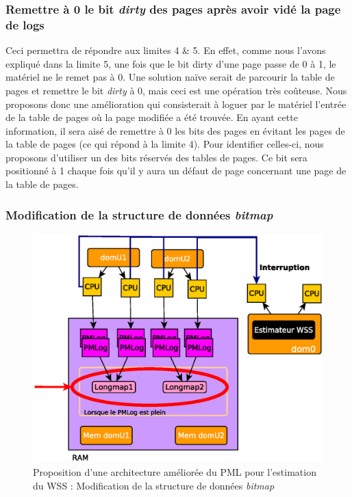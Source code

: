 \subsubsection{Remettre à 0 le bit \textit{dirty} des pages après avoir vidé la page de logs}
Ceci permettra de répondre aux limites 4 \& 5. En effet, comme nous l'avons expliqué dans la limite 5, une fois que le bit dirty d'une page passe de 0 à 1, le matériel ne le remet pas à 0. Une solution naïve serait de parcourir la table de pages et remettre le bit \textit{dirty} à 0, mais ceci est une opération très coûteuse. Nous proposons donc une amélioration qui consisterait à loguer par le matériel l'entrée de la table de pages où la page modifiée a été trouvée. En ayant cette information, il sera aisé de remettre à 0 les bits des pages en évitant les pages de la table de pages (ce qui répond à la limite 4). Pour identifier celles-ci, nous proposons d'utiliser un des bits réservés des tables de pages. Ce bit sera positionné à 1 chaque fois qu'il y aura un défaut de page concernant une page de la table de pages.

\subsubsection{Modification de la structure de données \textit{bitmap}}
\begin{figure}[H]
    \centering
    \includegraphics[scale=.8]{chapters/3/fig3/PMLOverview3}
    \caption{Proposition d'une architecture améliorée du PML pour l'estimation du WSS : Modification de la structure de données \textit{bitmap}}
    \label{fig:bitmap}
\end{figure}

